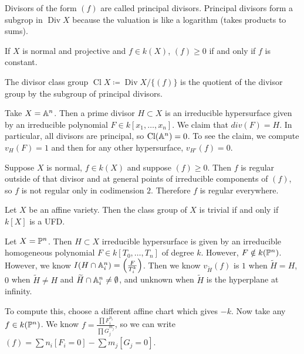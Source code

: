 \documentclass[twoside, 10pt]{article}
\begin{document}
        \begin{rmk}
            Divisors of the form $(f)$ are called principal divisors. Principal divisors form a subgrop in $\operatorname{Div} X$ because the valuation is like a logarithm (takes products to sums).
        \end{rmk}
        
        \begin{exm}
            If $X$ is normal and projective and $f \in k(X)$, $(f) \geq 0$ if and only if $f$ is constant.
        \end{exm}
        \begin{defn}
            The divisor class group $\operatorname{Cl} X \coloneqq \operatorname{Div} X / \{(f)\}$ is the quotient of the divisor group by the subgroup of principal divisors.
        \end{defn}
        
        \begin{exm}
            Take $X = \A^n$. Then a prime divisor $H \subset X$ is an irreducible hypersurface given by an irreducible polynomial $F \in k[x_1, \ldots, x_n]$. We claim that $div(F) = H$. In particular, all divisors are principal, so $\operatorname{Cl}(\A^n) = 0$. To see the claim, we compute $v_H(F) = 1$ and then for any other hypersurface, $v_{H'}(f) = 0$.
        \end{exm}

        \begin{rmk}
            Suppose $X$ is normal, $f \in k(X)$ and suppose $(f) \geq 0$. Then $f$ is regular outside of that divisor and at general points of irreducible components of $(f)$, so $f$ is not regular only in codimension $2$. Therefore $f$ is regular everywhere.
        \end{rmk}

        \begin{prop}[Homework]
            Let $X$ be an affine variety. Then the class group of $X$ is trivial if and only if $k[X]$ is a UFD.
        \end{prop}

        \begin{exm}
            Let $X = \P^n$. Then $H \subset X$ irreducible hypersurface is given by an irreducible homogeneous polynomial $F \in k[T_0, \ldots, T_n]$ of degree $k$. However, $F \notin k(\P^n)$. However, we know $I(H \cap \A^n_i) = \left(\frac{F}{T_i^k}\right)$. Then we know $v_{\widetilde{H}}(f)$ is $1$ when $\widetilde{H} = H$, $0$ when $\widetilde{H} \neq H$ and $\widetilde{H} \cap \A^n_i \neq \emptyset$, and unknown when $\widetilde{H}$ is the hyperplane at infinity.

            To compute this, choose a different affine chart which gives $-k$. Now take any $f \in k(\P^n)$. We know $f = \frac{\prod F_i^{n_i}}{\prod G_j^{m_j}}$, so we can write $(f) = \sum n_i [F_i = 0] - \sum m_j[G_j = 0]$.
        \end{exm}
\end{document}
